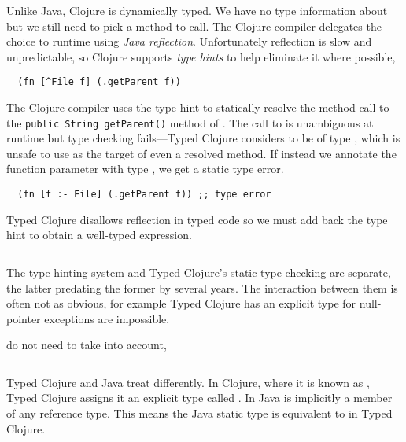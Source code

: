 Unlike Java, Clojure is dynamically typed. We have no type information about 
but we still need to pick a method to call. The Clojure compiler delegates
the choice to runtime using \emph{Java reflection}.
Unfortunately reflection is slow and unpredictable, so Clojure supports \emph{type hints}
to help eliminate it where possible, 

\begin{verbatim}
  (fn [^File f] (.getParent f))
\end{verbatim}

The Clojure compiler uses the type hint
to statically resolve 
the method call to the
\texttt{public String getParent()}
method of .
The call to  is unambiguous at runtime but type 
checking fails---Typed Clojure
considers  to be of type , which is unsafe 
to use as the target of even a resolved method.
If instead we annotate the function parameter with type ,
we get a static type error.

\begin{verbatim}
  (fn [f :- File] (.getParent f)) ;; type error
\end{verbatim}

Typed Clojure disallows reflection in typed code
so we must add back the type hint to obtain a well-typed
expression.

\begin{exmp}
\inputminted[firstline=10,lastline=10]{clojure}{code/demo/src/demo/parent3.clj}
\end{exmp}


The type hinting system and Typed Clojure's static type checking
are separate, the latter predating the former by several years.
The interaction between them is often not as obvious, for example Typed Clojure
has an explicit type for 
null-pointer exceptions are impossible.

do not need to take  into account, 

\begin{exmp}
\inputminted[firstline=18,lastline=19]{clojure}{code/demo/src/demo/parent3.clj}
\end{exmp}

Typed Clojure and Java treat  differently.
In Clojure, where it is known as , Typed Clojure assigns it an explicit type
called . In Java  is implicitly a member of any reference type.
This means the Java static type  is equivalent to
 in Typed Clojure.

